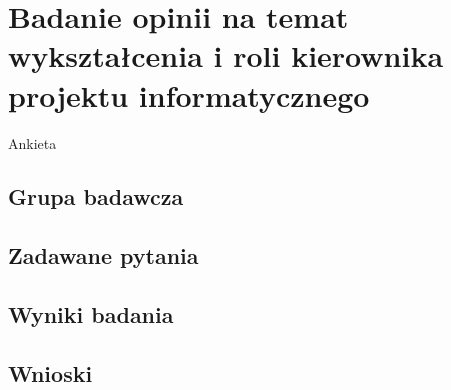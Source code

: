 \newpage
\section{Badanie opinii na temat wykształcenia i roli kierownika projektu informatycznego}
Ankieta
\subsection{Grupa badawcza}
\subsection{Zadawane pytania}
\subsection{Wyniki badania}
\subsection{Wnioski}